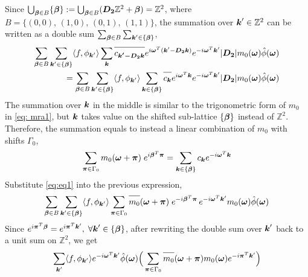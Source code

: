 Since $\bigcup_{\boldsymbol{\beta}\in B} \{\boldsymbol{\beta}\} :=\bigcup_{\boldsymbol{\beta}\in B}(\boldsymbol{D_2}\mathbb{Z}^2+\boldsymbol{\beta}) = \mathbb{Z}^2$, where $B = \{ (0,0),\,(1,0),\,(0,1),\,(1,1)\}$, the summation over $\boldsymbol{k}'\in \mathbb{Z}^2$ can be written as a double sum $\sum_{\boldsymbol{\beta}\in B}\sum_{\boldsymbol{k}'\in \{\boldsymbol{\beta}\}}$,
\begin{align*}
\sum_{\V{\beta}\in B}\sum_{\V{k}'\in\{\V{\beta}\}} \langle f,\phi_{\V{k}'}\rangle\sum_{\V{k}}\overlinespace{c_{\V{k'-D_2k}}}e^{i\V{\omega}^T(\V{k}'-\V{D_2k})}e^{-i\V{\omega}^T\V{k}'}|\V{D_2}|m_0(\V{\omega})\hat{\phi}(\V{\omega})\\
=\sum_{\V{\beta}\in B}\sum_{\V{k}'\in\{\V{\beta}\}} \langle f,\phi_{\V{k}'}\rangle\sum_{\V{k}\in\{\V{\beta}\}}\overlinespace{c_{\V{k}}}e^{i\V{\omega}^T\V{k}}e^{-i\V{\omega}^T\V{k}'}|\V{D_2}|m_0(\V{\omega})\hat{\phi}(\V{\omega})
\end{align*}
The summation over $\boldsymbol{k}$ in the middle is similar to the trigonometric form of $m_0$ in \eqref{eq: mra1}, but $\boldsymbol{k}$ takes value on the shifted sub-lattice $\{\boldsymbol{\beta}\}$ instead of $\mathbb{Z}^2$. Therefore, the summation equals to instead a linear combination of $m_0$ with shifts $\Gamma_0$,
\begin{align}\label{eq:eq1}
\sum_{\boldsymbol{\pi}\in\Gamma_0}m_0(\boldsymbol{\omega}+\boldsymbol{\pi})\;e^{i\boldsymbol{\beta}^T\boldsymbol{\pi}} = \sum_{\boldsymbol{k}\in \{\boldsymbol{\beta}\}}c_{\boldsymbol{k}}e^{-i\boldsymbol{\omega}^T\boldsymbol{k}}
\end{align}
Substitute \eqref{eq:eq1} into the previous expression,
\begin{align*}
\sum_{\V{\beta}\in B}\sum_{\V{k}'\in \{\V{\beta}\}}\langle f,\phi_{\V{k}'}\rangle\sum_{\V{\pi}\in\Gamma_0}\overlinespace{m_0}(\V{\omega}+\V{\pi})\;e^{-i\V{\beta}^T\V{\pi}}\,e^{-i\V{\omega}^T\V{k}'}m_0(\V{\omega})\hat{\phi}(\V{\omega})
\end{align*}
Since $e^{i \boldsymbol{\pi}^{T}\boldsymbol{\beta}}=e^{i\boldsymbol{\pi}^T\boldsymbol{k}'},\; \forall \boldsymbol{k}'\in \{\boldsymbol{\beta}\} $, after rewriting the double sum over $\boldsymbol{k}'$ back to a unit sum on $\mathbb{Z}^2$, we get
\begin{align*}
\sum_{\V{k}'}\langle f,\phi_{\V{k}'}\rangle e^{-i\V{\omega} ^T\V{k}'}\hat{\phi}(\V{\omega})\Big(\sum_{\V{\pi}\in\Gamma_0}\overlinespace{m_0}(\V{\omega}+\V{\pi})m_0(\V{\omega})e^{-i\V{\pi}^T\V{k}'} \Big)
\end{align*}

